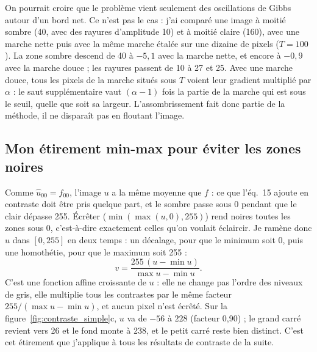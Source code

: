 \documentclass[11pt,a4paper]{article}
\newcommand{\ft}[1]{\widehat{#1}}
\begin{document}
On pourrait croire que le problème vient seulement des oscillations de Gibbs autour d'un bord net. Ce
n'est pas le cas : j'ai comparé une image à moitié sombre (40, avec des rayures d'amplitude 10) et à
moitié claire (160), avec une marche nette puis avec la même marche étalée sur une dizaine de pixels
($T=100$). La zone sombre descend de 40 à $-5{,}1$ avec la marche nette, et encore à $-0{,}9$ avec la
marche douce ; les rayures passent de 10 à 27 et 25. Avec une marche douce, tous les pixels de la marche
situés sous $T$ voient leur gradient multiplié par $\alpha$ : le saut supplémentaire vaut $(\alpha-1)$
fois la partie de la marche qui est sous le seuil, quelle que soit sa largeur. L'assombrissement fait donc
partie de la méthode, il ne disparaît pas en floutant l'image.

\subsection{Mon étirement min-max pour éviter les zones noires}\label{sec:etirement}

Comme $\ft u_{00}=\ft f_{00}$, l'image $u$ a la même moyenne que $f$ : ce que l'éq.~15 ajoute en contraste
doit être pris quelque part, et le sombre passe sous 0 pendant que le clair dépasse 255. Écrêter
($\min(\max(u,0),255)$) rend noires toutes les zones sous 0, c'est-à-dire exactement celles qu'on voulait
éclaircir. Je ramène donc $u$ dans $[0,255]$ en deux temps : un décalage, pour que le minimum soit 0, puis
une homothétie, pour que le maximum soit 255 :
\[
  v = \frac{255\,(u - \min u)}{\max u - \min u}.
\]
C'est une fonction affine croissante de $u$ : elle ne change pas l'ordre des niveaux de gris, elle multiplie
tous les contrastes par le même facteur $255/(\max u - \min u)$, et aucun pixel n'est écrêté. Sur la
figure~\ref{fig:contraste_simple}c, $u$ va de $-56$ à $228$ (facteur 0,90) ; le grand carré revient vers
26 et le fond monte à 238, et le petit carré reste bien distinct. C'est cet étirement que j'applique à
tous les résultats de contraste de la suite.
\end{document}
